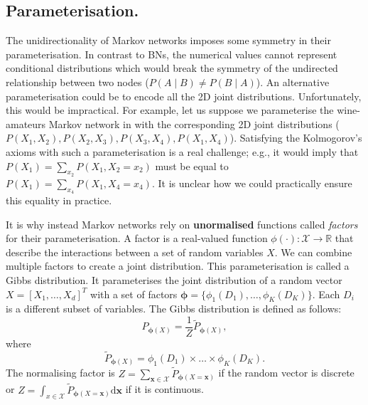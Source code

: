 \subsection{Parameterisation.}
The unidirectionality of Markov networks imposes some symmetry in their parameterisation. In contrast to BNs, the numerical values cannot represent conditional distributions which would break the symmetry of the undirected relationship between two nodes ($P(A \mid B) \neq P(B \mid A)$). An alternative parameterisation could be to encode all the 2D joint distributions. Unfortunately, this would be impractical. For example, let us suppose we parameterise the wine-amateurs Markov network in  with the corresponding 2D joint distributions ($P(X_1, X_2), P(X_2, X_3), P(X_3, X_4), P(X_1, X_4)$). Satisfying the Kolmogorov's axioms with such a parameterisation is a real challenge; e.g., it would imply that $P(X_1) = \sum_{x_2}P(X_1, X_2=x_2)$ must be equal to $P(X_1) = \sum_{x_4}P(X_1, X_4=x_4)$. It is unclear how we could practically ensure this equality in practice.
%



It is why instead Markov networks rely on \textbf{unormalised} functions called \textit{factors} for their parameterisation. A factor is a real-valued function $\phi(\cdot): \mathcal{X} \rightarrow \mathbb{R}$ that describe the interactions between a set of random variables $X$. We can combine multiple factors to create a joint distribution. This parameterisation is called a Gibbs distribution. It parameterises the joint distribution of a random vector $X = \left[X_1, \hdots, X_d\right]^T$ with a set of factors $\bm{\phi} = \{ \phi_1(D_1), \dots, \phi_K(D_K) \}$. Each $D_i$ is a different subset of variables. The Gibbs distribution is defined as follows:
$$P_{\bm{\phi}(X)} = \frac{1}{Z}\tilde{P}_{\bm{\phi}(X)},$$
where
$$ \tilde{P}_{\bm{\phi}(X)} = \phi_1(D_1) \times \dots \times \phi_K(D_K). $$
The normalising factor is $Z=\sum_{\bm{x} \in \mathcal{X}}\tilde{P}_{\bm{\phi}(X=\bm{x})}$ if the random vector is discrete or $Z=\int_{x \in \mathcal{X}}\tilde{P}_{\bm{\phi}(X=\bm{x})}\text{d}\bm{x}$ if it is continuous.


